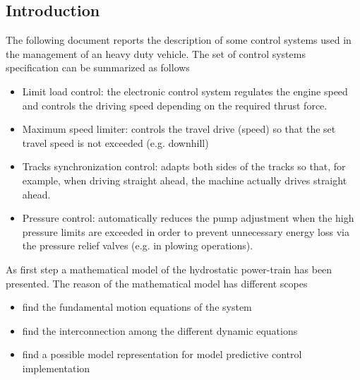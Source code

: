 \documentclass[12pt,a4paper,oneside]{book}
\begin{document}
\begin{onehalfspace}
\section{Introduction}
The following document reports the description of some control systems used in the management of an heavy duty vehicle. The set of control systems specification can be summarized as follows
\begin{itemize} 
	\item Limit load control: the electronic control system regulates the engine speed and controls the driving speed depending on the required thrust force.
	\item Maximum speed limiter: controls the travel drive (speed) so that the set travel speed is not exceeded (e.g. downhill)
	\item Tracks synchronization control: adapts both sides of the tracks so that, for example, when driving straight ahead, the machine actually drives straight ahead.
	\item Pressure control: automatically reduces the pump adjustment when the high pressure limits are exceeded in order to prevent unnecessary energy loss via the pressure relief valves (e.g. in plowing operations).
\end{itemize} 

As first step a mathematical model of the hydrostatic power-train has been presented. The reason of the mathematical model has different scopes
\begin{itemize}
	\item find the fundamental motion equations of the system
	\item find the interconnection among the different dynamic equations
	\item find a possible model representation for model predictive control implementation
\end{itemize}   
%


\end{onehalfspace}
\end{document}
